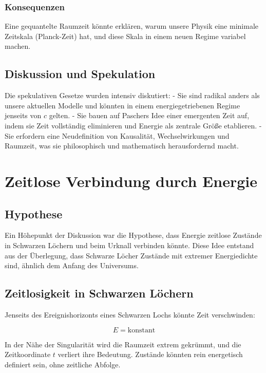 \documentclass{article}
\begin{document}
	\subsubsection{Konsequenzen}
	
	Eine gequantelte Raumzeit könnte erklären, warum unsere Physik eine minimale Zeitskala (Planck-Zeit) hat, und diese Skala in einem neuen Regime variabel machen.
	
	\subsection{Diskussion und Spekulation}
	
	Die spekulativen Gesetze wurden intensiv diskutiert:
	- Sie sind radikal anders als unsere aktuellen Modelle und könnten in einem energiegetriebenen Regime jenseits von \( c \) gelten.
	- Sie bauen auf Paschers Idee einer emergenten Zeit auf, indem sie Zeit vollständig eliminieren und Energie als zentrale Größe etablieren.
	- Sie erfordern eine Neudefinition von Kausalität, Wechselwirkungen und Raumzeit, was sie philosophisch und mathematisch herausfordernd macht.
	
	\section{Zeitlose Verbindung durch Energie}
	
	\subsection{Hypothese}
	
	Ein Höhepunkt der Diskussion war die Hypothese, dass Energie zeitlose Zustände in Schwarzen Löchern und beim Urknall verbinden könnte. Diese Idee entstand aus der Überlegung, dass Schwarze Löcher Zustände mit extremer Energiedichte sind, ähnlich dem Anfang des Universums.
	
	\subsection{Zeitlosigkeit in Schwarzen Löchern}
	
	Jenseits des Ereignishorizonts eines Schwarzen Lochs könnte Zeit verschwinden:
	
	\[
	E = \text{konstant}
	\]
	
	In der Nähe der Singularität wird die Raumzeit extrem gekrümmt, und die Zeitkoordinate \( t \) verliert ihre Bedeutung. Zustände könnten rein energetisch definiert sein, ohne zeitliche Abfolge.
	
\end{document}
